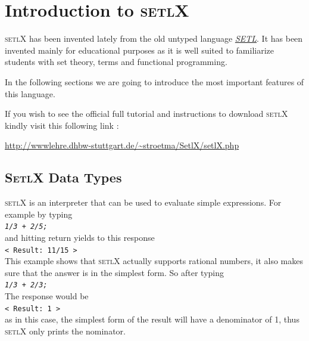 \documentclass[11pt]{report}
\begin{document}
\chapter{Introduction to \textsc{setlX}}

\textsc{setlX} has been invented lately from the old untyped language \href{http://en.wikipedia.org/wiki/SETL}{\emph{SETL}}. It has been invented mainly for educational purposes as it is well suited to familiarize students with set theory, terms and functional programming.

In the following sections we are going to introduce the most important features of this language.

\begin{center} If you wish to see the official full tutorial and instructions to download \textsc{setlX} kindly visit this following link : 

\url{http://wwwlehre.dhbw-stuttgart.de/~stroetma/SetlX/setlX.php} \end{center}

\section{\textsc{SetlX} Data Types}

\textsc{setlX} is an interpreter that can be used to evaluate simple expressions. For example by typing 
\\[0.2cm]
\hspace*{1.3cm}
\texttt{\textsl{1/3 + 2/5;}}
\\[0.2cm]
and hitting return yields to this response
\\[0.2cm]
\hspace*{1.3cm}
\texttt{< Result: 11/15 >}
\\[0.2cm]
This example shows that \textsc{setlX} actually supports rational numbers, it also makes sure that the answer is in the simplest form. So after typing
\\[0.2cm]
\hspace*{1.3cm}
\texttt{\textsl{1/3 + 2/3;}}
\\[0.2cm]
The response would be
\\[0.2cm]
\hspace*{1.3cm}
\texttt{< Result: 1 >}
\\[0.2cm]
as in this case, the simplest form of the result will have a denominator of 1, thus \textsc{setlX} only prints the nominator.
\end{document}
